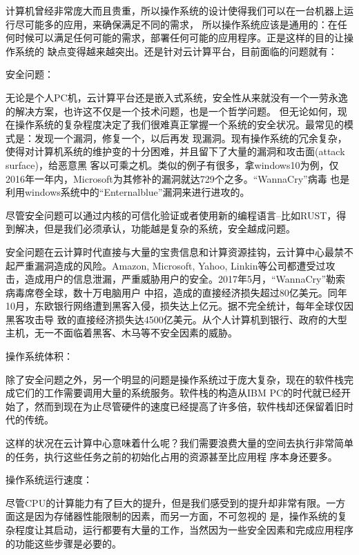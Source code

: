 \documentclass[fontsize=13pt, %
    paper=a4, %
    twoside, %
    captions=tableheading,
    index=totoc,
    hyperref]{labbook}
\begin{document}
\begin{spacing}{1.0}
\begin{addmargin}[4cm]{0cm}


计算机曾经非常庞大而且贵重，所以操作系统的设计使得我们可以在一台机器上运行尽可能多的应用，来确保满足不同的需求，
所以操作系统应该是通用的：在任何时候可以满足任何可能的需求，部署任何可能的应用程序。正是这样的目的让操作系统的
缺点变得越来越突出。还是针对云计算平台，目前面临的问题就有：

安全问题：

无论是个人PC机，云计算平台还是嵌入式系统，安全性从来就没有一个一劳永逸的解决方案，也许这不仅是一个技术问题，也是一个哲学问题。
但无论如何，现在操作系统的复杂程度决定了我们很难真正掌握一个系统的安全状况。最常见的模式是：发现一个漏洞，修复一个，以后再发
现漏洞。现有操作系统的冗余复杂，使得对计算机系统的维护变的十分困难，并且留下了大量的漏洞和攻击面(attack surface)，给恶意黑
客以可乘之机。类似的例子有很多，拿windows10为例，仅2016年一年内，Microsoft为其修补的漏洞就达729个之多。“WannaCry”病毒
也是利用windows系统中的“Enternalblue”漏洞来进行进攻的。

尽管安全问题可以通过内核的可信化验证或者使用新的编程语言--比如RUST，得到解决，但是我们必须承认，功能越是复杂的系统，安全越成问题。

安全问题在云计算时代直接与大量的宝贵信息和计算资源挂钩，云计算中心最禁不起严重漏洞造成的风险。Amazon, Microsoft, Yahoo,
Linkin等公司都遭受过攻击，造成用户的信息泄漏，严重威胁用户的安全。2017年5月，“WannaCry”勒索病毒席卷全球，数十万电脑用户
中招，造成的直接经济损失超过80亿美元。同年10月，东欧银行网络遭到黑客入侵，损失达上亿元。据不完全统计，每年全球仅因黑客攻击导
致的直接经济损失达4500亿美元。从个人计算机到银行、政府的大型主机，无一不面临着黑客、木马等不安全因素的威胁。

操作系统体积：

除了安全问题之外，另一个明显的问题是操作系统过于庞大复杂，现在的软件栈完成它们的工作需要调用大量的系统服务。软件栈的构造从IBM
PC的时代就已经开始了，然而到现在为止尽管硬件的速度已经提高了许多倍，软件栈却还保留着旧时代的传统。

这样的状况在云计算中心意味着什么呢？我们需要浪费大量的空间去执行非常简单的任务，执行这些任务之前的初始化占用的资源甚至比应用程
序本身还要多。

操作系统运行速度：

尽管CPU的计算能力有了巨大的提升，但是我们感受到的提升却非常有限。一方面这是因为存储器性能限制的因素，而另一方面，不可忽视的
是，操作系统的复杂程度让其启动，运行都要有大量的工作，当然因为一些安全因素和完成应用程序的功能这些步骤是必要的。


\end{addmargin}
\end{spacing}
\end{document}
